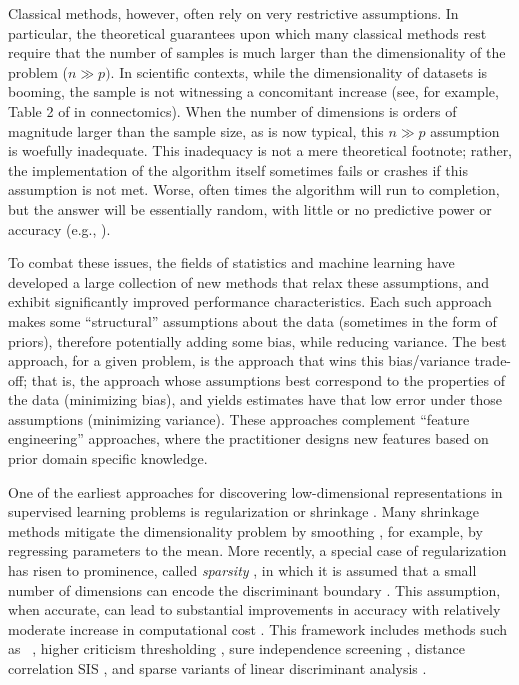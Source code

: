 \documentclass[10pt]{article}
\begin{document}
Classical methods, however, often rely on very restrictive assumptions. In particular, the theoretical guarantees upon which many classical methods rest require that the number of samples is much larger than the dimensionality of the problem ($n \gg p)$.  
In scientific contexts, while the dimensionality of datasets is booming, the sample is not witnessing a concomitant increase (see, for example, Table 2 of \cite{diMartino2013a} in connectomics).
When the number of dimensions is orders of magnitude larger than the sample size, as is now typical, this $n \gg p$ assumption is woefully inadequate.
This inadequacy is not a mere theoretical footnote; rather, the implementation of the algorithm itself sometimes fails or crashes if this assumption is not met.  Worse, often times the algorithm will run to completion, but the answer will be essentially random, with little or no predictive power or accuracy (e.g., \cite{Eklund2012}).

To combat these issues, the fields of statistics and machine learning have developed a large collection of new methods that relax these assumptions, and exhibit significantly improved performance characteristics.  Each such approach makes some ``structural'' assumptions about the data (sometimes in the form of priors), therefore potentially adding some bias, while reducing variance.  The best approach, for a given problem, is the approach that wins this bias/variance trade-off; that is, the approach whose assumptions best correspond to the properties of the data (minimizing bias), and yields estimates have that low error under those assumptions (minimizing variance). These approaches complement ``feature engineering'' approaches, where the practitioner designs new features based on prior domain specific knowledge.



One of the earliest approaches for discovering low-dimensional representations in supervised learning problems is regularization or shrinkage \cite{Friedman1989a,Bickel2004a,Bouveyron2007}.  Many shrinkage methods  mitigate the dimensionality problem by smoothing \cite{Witten2009a}, for example, by regressing parameters to the mean.  More recently, a special case of regularization has risen to prominence, called \emph{sparsity} \cite{Olshausen1997a}, in which it is assumed that a small number of dimensions can encode the discriminant boundary \cite{Tibshirani1996}.  This assumption, when accurate, can lead to substantial improvements in accuracy with relatively moderate increase in computational cost \cite{Yuan2006a}.  This framework includes methods such as ~\cite{Tibshirani1996}, higher criticism thresholding \cite{Donoho2008a}, sure independence screening \cite{}, distance correlation SIS \cite{Li2012},  and sparse variants of linear discriminant analysis \cite{Tibshirani2002a,Fan2008a,Witten2009a,Clemmensen2011a,Mai2013a,Fan2012a}.  
\end{document}
